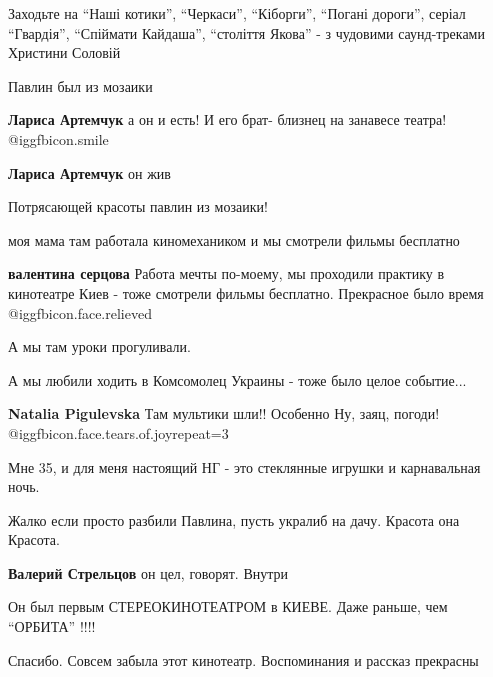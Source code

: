 \begin{itemize}

Заходьте на \enquote{Наші котики}, \enquote{Черкаси}, \enquote{Кіборги}, \enquote{Погані дороги},
серіал \enquote{Гвардія}, \enquote{Спіймати Кайдаша}, \enquote{століття Якова} - з чудовими саунд-треками
Христини Соловій


Павлин был из мозаики

\begin{itemize} %
\textbf{Лариса Артемчук} а он и есть! И его брат- близнец на занавесе театра! @igg{fbicon.smile} 

\textbf{Лариса Артемчук} он жив

Потрясающей красоты павлин из мозаики!
\end{itemize} %

моя мама там работала киномехаником и мы смотрели фильмы бесплатно

\begin{itemize} %
\textbf{валентина серцова} Работа мечты по-моему, мы проходили практику в кинотеатре Киев - тоже смотрели фильмы бесплатно. Прекрасное было время  @igg{fbicon.face.relieved} 
\end{itemize} %

А мы там уроки прогуливали.

А мы любили ходить в Комсомолец Украины - тоже было целое событие...

\begin{itemize} %
\textbf{Natalia Pigulevska} Там мультики шли!! Особенно Ну, заяц, погоди! @igg{fbicon.face.tears.of.joy}{repeat=3} 
\end{itemize} %

Мне 35, и для меня настоящий НГ - это стеклянные игрушки и карнавальная ночь.

Жалко если просто разбили Павлина, пусть укралиб на дачу. Красота она Красота.

\begin{itemize} %
\textbf{Валерий Стрельцов} он цел, говорят. Внутри
\end{itemize} %

Он был первым СТЕРЕОКИНОТЕАТРОМ в КИЕВЕ.
Даже раньше, чем \enquote{ОРБИТА} !!!!

Спасибо. Совсем забыла этот кинотеатр. Воспоминания и рассказ прекрасны


\end{itemize}
